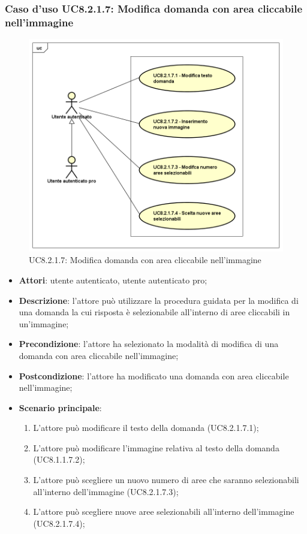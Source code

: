\subsubsection{Caso d'uso UC8.2.1.7: Modifica domanda con area cliccabile nell'immagine}
\label{UC8.2.1.7}
\begin{figure}[h]
	\centering
	\includegraphics[scale=0.5,keepaspectratio]{UML/UC8_2_1_7.png}
	\caption{UC8.2.1.7: Modifica domanda con area cliccabile nell'immagine}
\end{figure}
\FloatBarrier
\begin{itemize}
	\item \textbf{Attori}: utente autenticato, utente autenticato pro;
	\item \textbf{Descrizione}: l'attore può utilizzare la procedura guidata per la modifica di una domanda la cui risposta è selezionabile all'interno di aree cliccabili in un'immagine;
	\item \textbf{Precondizione}: l'attore ha selezionato la modalità di modifica di una domanda con area cliccabile nell'immagine; 
	\item \textbf{Postcondizione}: l'attore ha modificato una domanda con area cliccabile nell'immagine;
	\item \textbf{Scenario principale}:
		\begin{enumerate}
	       	\item L'attore può modificare il testo della domanda (UC8.2.1.7.1);
	        \item L'attore può modificare l'immagine relativa al testo della domanda (UC8.1.1.7.2);
			\item L'attore può scegliere un nuovo numero di aree che saranno selezionabili all'interno dell'immagine (UC8.2.1.7.3);
			\item L'attore può scegliere nuove aree selezionabili all'interno dell'immagine (UC8.2.1.7.4);
	 	\end{enumerate}
\end{itemize}

